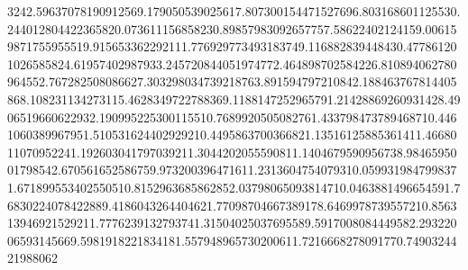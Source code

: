 3242.59637078190912569.179050539025617.807300154471527696.803168601125530.244012804422365820.073611156858230.89857983092657757.58622402124159.006159871755955519.915653362292111.776929773493183749.116882839448430.477861201026585824.61957402987933.245720844051974772.464898702584226.810894062780964552.767282508086627.303298034739218763.891594797210842.188463767814405868.108231134273115.4628349722788369.1188147252965791.21428869260931428.4906519660622932.190995225300115510.7689920505082761.433798473789468710.4461060389967951.510531624402929210.4495863700366821.13516125885361411.4668011070952241.192603041797039211.3044202055590811.1404679590956738.9846595001798542.670561652586759.973200396471611.2313604754079310.0599319847998371.671899553402550510.8152963685862852.03798065093814710.0463881496654591.76830224078422889.4186043264404621.77098704667389178.6469978739557210.856313946921529211.7776239132793741.31504025037695589.5917008084449582.29322006593145669.5981918221834181.557948965730200611.7216668278091770.7490324421988062